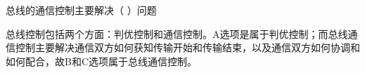\question 总线的通信控制主要解决（ ）问题
\par{}
\begin{solution}总线控制包括两个方面：判优控制和通信控制。A选项是属于判优控制；而总线通信控制主要解决通信双方如何获知传输开始和传输结束，以及通信双方如何协调和如何配合，故B和C选项属于总线通信控制。
\end{solution}
